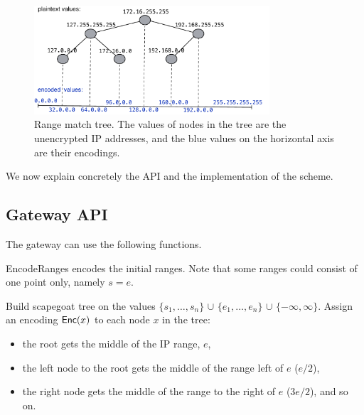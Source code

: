\begin{figure}
  \includegraphics[width=3.45in]{fig/tree}
  \caption{\label{fig:tree} Range match tree. The values of nodes in the tree are the unencrypted IP addresses, and the blue values on the horizontal axis are their encodings. }
\end{figure}




We now explain concretely the API and the implementation of the scheme. 

\subsection{Gateway API}

The gateway can use the following functions. 

EncodeRanges encodes the initial ranges. Note that some ranges could consist of
one point only, namely $s = e$. 


\begin{framed}
\begin{algorithmic}[1]

  \State Build scapegoat tree on the values 
              $\{s_1, \dots, s_n\}$ 
              $\cup$ $\{e_1, \dots, e_n\}$ 
              $\cup$ $\{-\infty, \infty\}$.
  \State Assign an encoding $\mathsf{Enc}(x)$ to each node $x$ in the tree:
  \begin{itemize}
  \item the root gets the middle of the IP range, $e$, 
  \item the left node to the root gets the middle of the range left of $e$ ($e/2$),
  \item the right node gets the middle of the range
  to the right of $e$ ($3e/2$), and so on.
  \end{itemize}

  \State {}
\EndProcedure

\end{algorithmic}
\end{framed}

